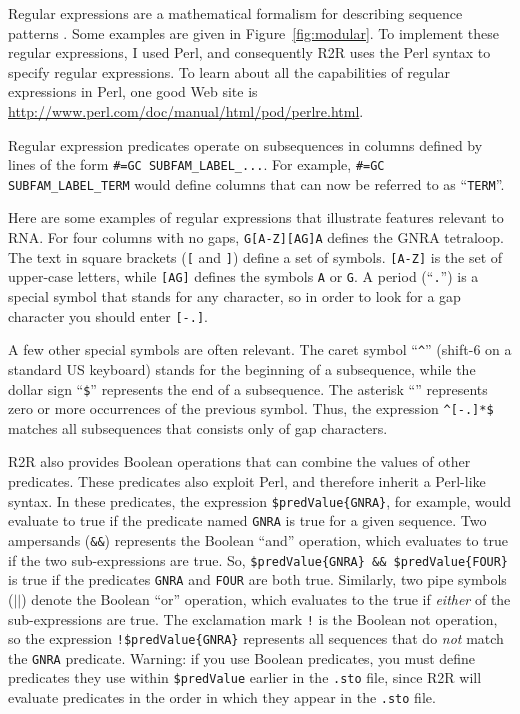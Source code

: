 \documentclass[letterpaper,12pt]{report}
\begin{document}
Regular expressions are a mathematical formalism for describing sequence patterns \cite{EddyBook}.
Some examples are given in Figure~\ref{fig:modular}.
To implement these regular expressions, I used Perl, and consequently R2R uses the Perl syntax to specify regular expressions.
To learn about all the capabilities of regular expressions in Perl, one good Web site is \url{http://www.perl.com/doc/manual/html/pod/perlre.html}.

Regular expression predicates operate on subsequences in columns defined by lines of the form {\tt \#=GC SUBFAM\_LABEL\_...}.
For example, {\tt \#=GC SUBFAM\_LABEL\_TERM} would define columns that can now be referred to as ``{\tt TERM}''.

Here are some examples of regular expressions that illustrate features relevant to RNA.
For four columns with no gaps, {\tt G[A-Z][AG]A} defines the GNRA tetraloop.
The text in square brackets ({\tt [} and {\tt ]}) define a set of symbols.
{\tt [A-Z]} is the set of upper-case letters, while {\tt [AG]} defines the symbols
{\tt A} or {\tt G}.
A period (``{\tt .}'') is a special symbol that stands for any character, so in order to look for a gap character
you should enter {\tt [-.]}.

A few other special symbols are often relevant.
The caret symbol ``{\tt \verb|^|}'' (shift-6 on a standard US keyboard) stands for the beginning of a subsequence, while the dollar sign ``{\tt \$}'' represents the end
of a subsequence.
The asterisk ``{\tt *}'' represents zero or more occurrences of the previous symbol.
Thus, the expression {\tt \verb|^|[-.]*\$} matches all subsequences that consists only of gap characters.

R2R also provides Boolean operations that can combine the values of other predicates.  These predicates also exploit Perl, and therefore inherit a Perl-like syntax.
In these predicates, the expression {\tt \$predValue\{GNRA\}}, for example, would evaluate to true if the predicate
named {\tt GNRA} is true for a given sequence.
Two ampersands ({\tt \&\&}) represents the Boolean ``and'' operation, which evaluates to true if the two sub-expressions
are true.  So, {\tt \$predValue\{GNRA\} \&\& \$predValue\{FOUR\}} is true if the predicates {\tt GNRA} and {\tt FOUR}
are both true.  Similarly, two pipe symbols ({\tt $||$}) denote the Boolean ``or'' operation, which evaluates to the true
if {\em either} of the sub-expressions are true.
The exclamation mark {\tt !} is the Boolean not operation, so the expression {\tt !\$predValue\{GNRA\}} represents all sequences
that do {\em not} match the {\tt GNRA} predicate.
Warning: if you use Boolean predicates, you must define predicates they use within {\tt \$predValue} earlier in the {\tt .sto} file,
since R2R will evaluate predicates in the order in which they appear in the {\tt .sto} file.
\end{document}
